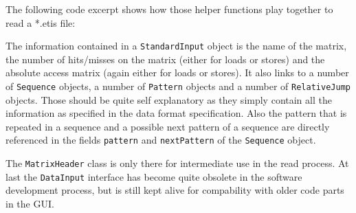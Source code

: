 The following code excerpt shows how those helper functions play together
to read a {*}.etis file:



The information contained in a \texttt{StandardInput} object is the
name of the matrix, the number of hits/misses on the matrix (either
for loads or stores) and the absolute access matrix (again either
for loads or stores). It also links to a number of \texttt{Sequence}
objects, a number of \texttt{Pattern} objects and a number of \texttt{RelativeJump}
objects. Those should be quite self explanatory as they simply contain
all the information as specified in the data format specification.
Also the pattern that is repeated in a sequence and a possible next
pattern of a sequence are directly referenced in the fields \texttt{pattern}
and \texttt{nextPattern} of the \texttt{Sequence} object.

The \texttt{MatrixHeader} class is only there for intermediate use
in the read process. At last the \texttt{DataInput} interface has
become quite obsolete in the software development process, but is
still kept alive for compability with older code parts in the GUI.
